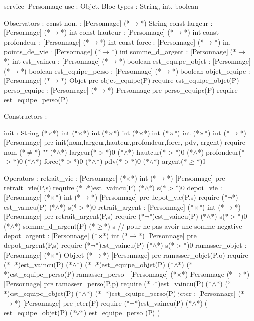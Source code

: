 \documentclass[a4paper, 11pt]{report}
\begin{document}
\begin{Spe}
service: Personnage
use : Objet, Bloc
types : String, int, boolean

Observators : 
	const nom : [Personnage] (*$\rightarrow$*) String
	const largeur : [Personnage] (*$\rightarrow$*) int
	const hauteur : [Personnage] (*$\rightarrow$*) int
	const profondeur : [Personnage] (*$\rightarrow$*) int
	const force : [Personnage] (*$\rightarrow$*) int 
	points_de_vie : [Personnage] (*$\rightarrow$*) int
	somme_d_argent : [Personnage] (*$\rightarrow$*) int 
	est_vaincu : [Personnage] (*$\rightarrow$*) boolean 
	est_equipe_objet : [Personnage] (*$\rightarrow$*) boolean
	est_equipe_perso : [Personnage] (*$\rightarrow$*) boolean 
	objet_equipe : [Personnage] (*$\rightarrow$*) Objet
		pre objet_equipe(P) require est_equipe_objet(P)
	perso_equipe : [Personnage] (*$\rightarrow$*) Personnage
		pre perso_equipe(P) require est_equipe_perso(P) 

Constructors : 

	init : String (*$\times$*) int (*$\times$*) int (*$\times$*) int (*$\times$*) int (*$\times$*) int (*$\times$*) int (*$\rightarrow$*) [Personnage]
		pre init(nom,largeur,hauteur,profondeur,force, pdv, argent) require nom (*$\neq$*) "" (*$\land$*) largeur(*$>$*)0 (*$\land$*) hauteur(*$>$*)0 (*$\land$*) profondeur(*$>$*)0 (*$\land$*) force(*$>$*)0 (*$\land$*) pdv(*$>$*)0 (*$\land$*) argent(*$\ge$*)0 

Operators :
	retrait_vie :  [Personnage] (*$\times$*) int (*$\rightarrow$*) [Personnage]
		pre retrait_vie(P,s) require (*$\lnot$*)est_vaincu(P) (*$\land$*) s(*$>$*)0
	depot_vie : [Personnage] (*$\times$*) int (*$\rightarrow$*) [Personnage]
		pre depot_vie(P,s) require (*$\lnot$*) est_vaincu(P) (*$\land$*) s(*$>$*)0
	retrait_argent :  [Personnage] (*$\times$*) int (*$\rightarrow$*) [Personnage]
		pre retrait_argent(P,s) require (*$\lnot$*)est_vaincu(P) (*$\land$*) s(*$>$*)0 (*$\land$*) somme_d_argent(P) (*$\ge$*) s // pour ne pas avoir une somme negative
	depot_argent : [Personnage] (*$\times$*) int (*$\rightarrow$*) [Personnage]
		pre depot_argent(P,s) require (*$\lnot$*)est_vaincu(P) (*$\land$*) s(*$>$*)0
	ramasser_objet : [Personnage] (*$\times$*) Object (*$\rightarrow$*) [Personnage]
		pre ramasser_objet(P,o) require (*$\lnot$*)est_vaincu(P) (*$\land$*) (*$\lnot$*)est_equipe_objet(P) (*$\land$*)  (*$\lnot$*)est_equipe_perso(P)
        ramasser_perso : [Personnage] (*$\times$*) Personnage (*$\rightarrow$*) [Personnage]
		pre ramasser_perso(P,p) require (*$\lnot$*)est_vaincu(P) (*$\land$*) (*$\lnot$*)est_equipe_objet(P) (*$\land$*) (*$\lnot$*)est_equipe_perso(P)
	jeter : [Personnage] (*$\rightarrow$*) [Personnage]
		pre jeter(P) require (*$\lnot$*)est_vaincu(P) (*$\land$*) ( est_equipe_objet(P) (*$\lor$*) est_equipe_perso (P) )


\end{Spe}
\end{document}
